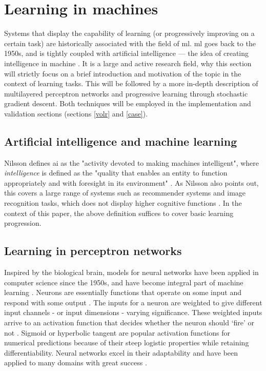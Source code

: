 \documentclass[a4paper,oneside]{memoir}
\begin{document}

\section{Learning in machines}
Systems that display the capability of learning (or progressively improving on
a certain task) are historically associated with the field of \gls{ml}.
\Gls{ml} goes back to the 1950s, and is tightly coupled
with artificial intelligence --- the idea of creating intelligence
in machine \autocite{Nilsson2009, russel2007}.
It is a large and active research field, why this section will strictly
focus on a brief introduction and motivation of the topic in the context of
learning tasks. This will be followed by a more in-depth description of
multilayered perceptron networks and progressive learning through stochastic
gradient descent. Both techniques will be employed in the implementation
and validation sections (sections \ref{volr} and \ref{case}).

\subsection{Artificial intelligence and machine learning}
Nilsson defines \gls{ai} as the "activity devoted to making machines
intelligent", where \textit{intelligence} is defined as the "quality that
enables an entity to function appropriately and with foresight in its
environment" \autocite[13]{Nilsson2009}. As Nilsson also points out, this
covers a large range of systems such as recommender systems and image recognition
tasks, which does not display higher cognitive functions \autocite[13]{Nilsson2009}.
In the context of this paper, the above definition suffices to cover basic
learning progression.

\subsection{Learning in perceptron networks}
Inspired by the biological brain, models for neural networks have been applied
in computer science since the 1950s, and have become integral part of machine
learning \autocite{Nilsson2009, russel2007}.
Neurons are essentially functions that operate on some input and respond with
some output \autocite{russel2007}. The inputs for a neuron are weighted to give
different input channels - or input dimensions - varying significance. These
weighted inputs arrive to an activation function that decides whether the
neuron should ‘fire’ or not \autocite{Nilsson2009}. Sigmoid or hyperbolic tangent
are popular
activation functions for numerical predictions because of their steep logistic
properties while retaining differentiability. Neural networks excel in their
adaptability and have been applied to many domains with great success
\autocite{schmidhuber2014, russel2007, Pedersen2017}.
\end{document}
